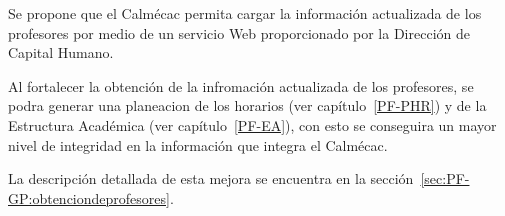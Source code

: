 \begin{Citemize}
	\item Se propone que el Calmécac permita cargar la información actualizada de los profesores por medio de un servicio Web proporcionado por la Dirección de Capital Humano.
	\item Al fortalecer la obtención de la infromación actualizada de los profesores, se podra generar una planeacion de los horarios  (ver capítulo~\ref{PF-PHR}) y de la Estructura Académica (ver capítulo~\ref{PF-EA}), con esto se conseguira un mayor nivel de integridad en la información que integra el Calmécac.
\end{Citemize}

	La descripción detallada de esta mejora se encuentra en la sección~\ref{sec:PF-GP:obtenciondeprofesores}.


